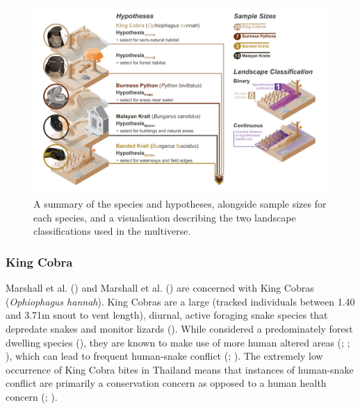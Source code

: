 \documentclass[10pt,a4paper]{article}
\begin{document}
\begin{figure}
\includegraphics[width=1\linewidth]{../ext_images/hypothesis_visual} \caption{A summary of the species and hypotheses, alongside sample sizes for each species, and a visualisation describing the two landscape classifications used in the multiverse.}\label{fig:hypothesesFigure}
\end{figure}

\subsubsection{King Cobra}\label{king-cobra}

Marshall et al. () and Marshall et al. () are concerned with King Cobras (\emph{Ophiophagus hannah}).
King Cobras are a large (tracked individuals between 1.40 and 3.71m snout to vent length), diurnal, active foraging snake species that depredate snakes and monitor lizards ().
While considered a predominately forest dwelling species (), they are known to make use of more human altered areas (; ; ), which can lead to frequent human-snake conflict (; ).
The extremely low occurrence of King Cobra bites in Thailand means that instances of human-snake conflict are primarily a conservation concern as opposed to a human health concern (; ).
\end{document}

